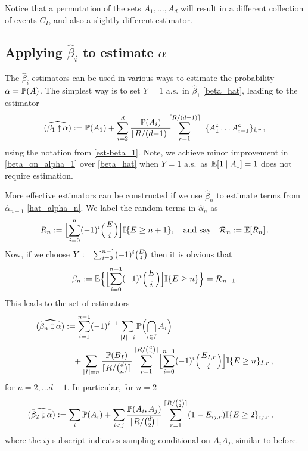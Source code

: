 Notice that a permutation of the sets $A_1,\dots,A_d$ will result in
a different collection of events $C_I$, and also a slightly different estimator.

\subsection{Applying $\hat{\beta}_i$ to estimate $\alpha$}

The $\hat{\beta}_i$ estimators can be used in various ways to estimate the probability
$\alpha=\operatorname{{\mathbb P}}(A)$. The simplest way is to set $Y=1$ a.s.\ in $\hat{\beta}_1$ \eqref{beta_hat},
leading to the estimator
\begin{align} \label{beta_on_alpha_1}
\widehat{(\beta_1 \ddagger \alpha)} := \operatorname{{\mathbb P}}(A_1) +
\sum_{i=2}^d \frac{\operatorname{{\mathbb P}}(A_i)}{\lceil R/(d{-}1) \rceil} \hspace{-5pt} \sum_{r=1}^{\lceil R/(d{-}1) \rceil}
	\mathbb{I}\{ A_1^{\mathsf{c}} \dots A_{i-1}^{\mathsf{c}} \}_{i,r}  \,,
\end{align}
using the notation from \eqref{est-beta_1}. Note, we achieve minor improvement in \eqref{beta_on_alpha_1} over \eqref{beta_hat} when $Y=1$ a.s.\ as $\operatorname{{\mathbb E}}[1 \mid A_1] = 1$ does not require estimation.

More effective estimators can be constructed if we use $\hat{\beta}_n$ to estimate terms from $\hat{\alpha}_{n-1}$ \eqref{hat_alpha_n}.
We label the random terms in $\hat{\alpha}_n$ as
\begin{equation}\label{residual}
 R_n \defeq \Bigl[ \sum_{i=0}^n (-1)^{i} \BigBinom{E}{i} \Bigr] \ind{ E \ge n+1}, \quad \text{and say} \quad \mathcal{R}_n \defeq\Exp[R_n] \,.
\end{equation}
Now, if we choose $Y:=\sum_{i=0}^{n-1} (-1)^{i} \binom{E}{i}$ then it is obvious that
\begin{equation*}
 \beta_n\defeq\Exp\Bigl\{ \Bigl[ \sum_{i=0}^{n-1} (-1)^{i} \BigBinom{E}{i} \Bigr] \ind{ E \ge n} \Bigr\}=\mathcal{R}_{n-1}.
\end{equation*}
This leads to the set of estimators
\begin{align*}
	\widehat{(\beta_n \ddagger \alpha)}
	&\defeq \sum_{i=1}^{n-1} (-1)^{i-1} \sum_{\card{I}=i} \Prob\Bigl( \bigcap_{i\in I} A_i \Bigr) \\
	&\quad +
	\sum_{\card{I}=n} \frac{ \Prob(B_I) }{\lceil R/\binom{d}{n} \rceil}
   \sum_{r=1}^{\lceil R/\binom{d}{n} \rceil}
   \Bigl[ \sum_{i=0}^{n-1} (-1)^{i} \BigBinom{E_{I,r}}{i} \Bigr]
	\ind{ E \ge n }_{I,r} \,,
\end{align*}
for $n = 2, \dots d-1$.
In particular, for $n=2$
\begin{align} \label{beta_on_alpha_2}
	\widehat{(\beta_2 \ddagger \alpha)}
	&:= \sum_i \operatorname{{\mathbb P}}(A_i) +
	\sum_{i<j} \frac{ \operatorname{{\mathbb P}}(A_i, A_j) }{\lceil R/\binom{d}{2} \rceil}
   \sum_{r=1}^{\lceil R/\binom{d}{2} \rceil}
   (1 - E_{ij,r}) \mathbb{I}\{  E \ge 2  \}_{ij,r} \,,
\end{align}
where the $ij$ subscript indicates sampling conditional on $A_iA_j$, similar to before.

